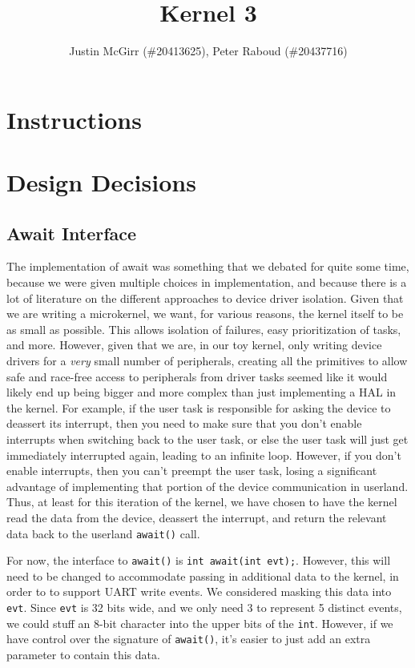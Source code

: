 \documentclass[titlepage]{article}
\begin{document}
\title{Kernel 3}
\author{Justin McGirr (\#20413625), Peter Raboud (\#20437716)}
\maketitle

\section{Instructions}


\section{Design Decisions}
\subsection{Await Interface}
The implementation of await was something that we debated for quite some time,
because we were given multiple choices in implementation, and because there is
a lot of literature on the different approaches to device driver isolation.
Given that we are writing a microkernel, we want, for various reasons, the
kernel itself to be as small as possible. This allows isolation of failures,
easy prioritization of tasks, and more. However, given that we are, in our toy
kernel, only writing device drivers for a \emph{very} small number of
peripherals, creating all the primitives to allow safe and race-free access
to peripherals from driver tasks seemed like it would likely end up being
bigger and more complex than just implementing a HAL in the kernel. For
example, if the user task is responsible for asking the device to deassert
its interrupt, then you need to make sure that you don't enable interrupts
when switching back to the user task, or else the user task will just get
immediately interrupted again, leading to an infinite loop. However, if you
don't enable interrupts, then you can't preempt the user task, losing a
significant advantage of implementing that portion of the device communication
in userland. Thus, at least for this iteration of the kernel, we have chosen
to have the kernel read the data from the device, deassert the interrupt,
and return the relevant data back to the userland \texttt{await()} call.

For now, the interface to \texttt{await()} is \texttt{int await(int evt);}.
However, this will need to be changed to accommodate passing in additional data
to the kernel, in order to to support UART write events.
We considered masking this data into \texttt{evt}.
Since \texttt{evt} is 32 bits wide, and we only need 3 to represent 5 distinct events,
we could stuff an 8-bit character into the upper bits of the \texttt{int}.
However, if we have control over the signature of \texttt{await()}, it's easier to just
add an extra parameter to contain this data.
\end{document}
